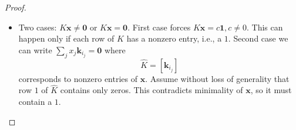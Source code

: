 \documentclass{beamer}
\newtheorem{conjecture}{Conjecture}
\renewcommand{\vec}[1]{\mathbf{#1}}
\begin{document}
{\begin{frame}
\begin{proof}
\begin{itemize}
            \item <3-> Two cases: $K\vec{x}\neq\vec{0}$ or $K\vec{x} = \vec{0}$.
            First case forces $K\vec{x} = c\vec{1}, c\neq 0$.
            This can happen only if each row of $K$ has a nonzero entry, i.e., a $1$.
            Second case we can write $\sum_j x_j \vec{k}_{i_j} = \vec{0}$ where
            \[
                \widehat{K} = [\vec{k}_{i_j}]
            \]
            corresponds to nonzero entries of $\vec{x}$.
            Assume without loss of generality that row $1$ of $\widehat{K}$ contains only zeros.
            This contradicts minimality of $\vec{x}$, so it must contain a $1$.\qedhere
        \end{itemize}
    \end{proof}
\end{frame}


}   



\end{document}
